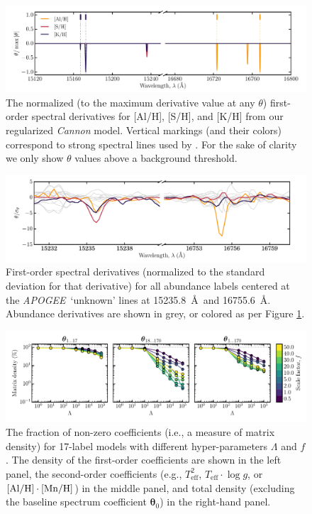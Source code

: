 \documentclass[12pt,preprint]{aastex}
\newcommand{\project}[1]{\textsl{#1}}
\newcommand{\acronym}[1]{{\small{#1}}}
\newcommand{\apogee}{\project{\acronym{APOGEE}}}
\newcommand{\logg}{\log g}
\newcommand{\Teff}{T_{\mathrm{eff}}}
\newcommand{\Dvector}[1]{\boldsymbol{#1}}
\newcommand{\vectheta}{\Dvector{\theta}}
\begin{document}
\clearpage

\begin{figure}[p]
\includegraphics[width=\textwidth]{line-identification.pdf}
\caption{The normalized (to the maximum derivative value at any $\theta$) first-order spectral derivatives for [Al/H], [S/H], and [K/H] from our regularized \emph{Cannon} model. Vertical markings (and their colors) correspond to strong spectral lines used by \citet{Smith_2013}. For the sake of clarity we only show $\theta$ values above a background threshold.\label{fig:line-identification}}
\end{figure}

\clearpage

\begin{figure}[p]
\centering
\includegraphics[width=\textwidth]{line-identification-zoom.pdf}
\caption{First-order spectral derivatives (normalized to the standard deviation for that derivative) for all abundance labels centered at the \apogee\ `unknown' lines at 15235.8~\AA\ and 16755.6~\AA. Abundance derivatives are shown in grey, or colored as per Figure \ref{fig:line-identification}.\label{fig:line-identification-2}}
\end{figure}

\clearpage

\begin{figure}[p]
\centering
\includegraphics[width=\textwidth]{sparsity.pdf}
\caption{The fraction of non-zero coefficients (i.e., a measure of matrix density) for 17-label models with different hyper-parameters $\Lambda$ and $f$.  The density of the first-order coefficients are shown in the left panel, the second-order coefficients (e.g., $\Teff^2$, $\Teff\cdot\logg$, or $[\rm{Al}/\rm{H}]\cdot[\rm{Mn}/\rm{H}]$) in the middle panel, and total density (excluding the baseline spectrum coefficient $\vectheta_0$) in the right-hand panel.\label{fig:sparsity}}
\end{figure}
\end{document}
